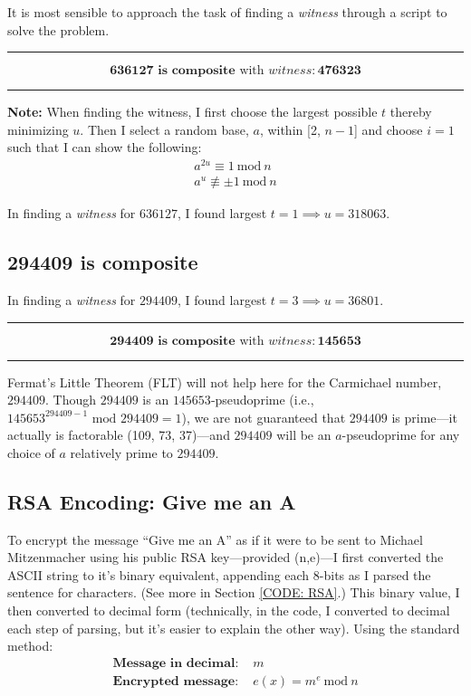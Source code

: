 \documentclass[conference]{styles/acmsiggraph}
\newcommand{\?}{\stackrel{?}{=}}
\begin{document}
It is most sensible to approach the task of finding a \textit{witness} through a script to solve the problem.

\rule{\textwidth}{0.4pt}
$$\mathbf{636127} \textbf{ is composite} \text{ with } \textit{witness}: \mathbf{476323}$$
\rule{\textwidth}{0.4pt}

\textbf{Note:} When finding the witness, I first choose the largest possible $t$ thereby minimizing $u$.  Then I select a random base, $a$, within [2, $n-1$] and choose $i = 1$ such that I can show the following: 
\begin{align}
    a^{2u} \equiv 1\  \text{mod}\  n \\
    a^{u} \nequiv \pm 1\  \text{mod}\  n
\end{align}

In finding a \textit{witness} for $636127$, I found largest $t = 1 \implies u = 318063$.

\subsection{294409 is composite}
In finding a \textit{witness} for $294409$, I found largest $t = 3 \implies u = 36801$.\\

\rule{\textwidth}{0.4pt}
$$\mathbf{294409} \textbf{ is composite} \text{ with } \textit{witness}: \mathbf{145653}$$
\rule{\textwidth}{0.4pt}

Fermat's Little Theorem (FLT) will not help here for the Carmichael number, $294409$.  Though $294409$ is an $145653$-pseudoprime (i.e., $145653^{294409-1} \text{ mod } 294409 = 1$), we are not guaranteed that $294409$ is prime---it actually is factorable (109, 73, 37)---and $294409$ will be an $a$-pseudoprime for any choice of $a$ relatively prime to $294409$.



\subsection{RSA Encoding: Give me an A}
To encrypt the message \enquote{Give me an A} as if it were to be sent to Michael Mitzenmacher using his public RSA key---provided (n,e)---I first converted the ASCII string to it's binary equivalent, appending each 8-bits as I parsed the sentence for characters.  (See more in Section \ref{CODE: RSA}.)  This binary value, I then converted to decimal form (technically, in the code, I converted to decimal each step of parsing, but it's easier to explain the other way).  Using the standard method:
\begin{align*}
    \textbf{Message in decimal: } & m\\
    \textbf{Encrypted message: } & e(x) = m^e\ \text{mod}\ n
\end{align*}
\end{document}
